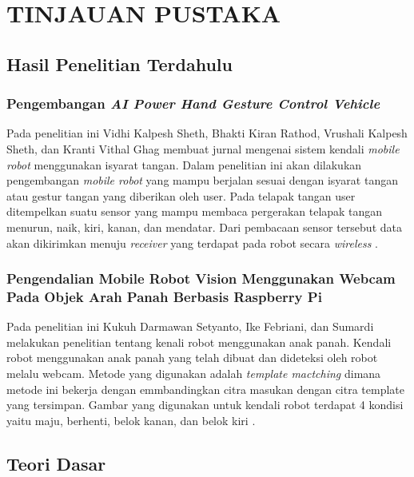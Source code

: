 \chapter{TINJAUAN PUSTAKA}

\section{Hasil Penelitian Terdahulu}
\subsection{Pengembangan \emph{AI Power Hand Gesture Control Vehicle}}
Pada penelitian ini Vidhi Kalpesh Sheth, Bhakti Kiran Rathod, Vrushali Kalpesh Sheth, dan Kranti Vithal Ghag membuat jurnal mengenai sistem kendali \textit{mobile robot} menggunakan isyarat tangan. Dalam penelitian ini akan dilakukan pengembangan \textit{mobile robot} yang mampu berjalan sesuai dengan isyarat tangan atau gestur tangan yang diberikan oleh user. Pada telapak tangan user ditempelkan suatu sensor yang mampu membaca pergerakan telapak tangan menurun, naik, kiri, kanan, dan mendatar. Dari pembacaan sensor tersebut data akan dikirimkan menuju \textit{receiver} yang terdapat pada robot secara \textit{wireless} \parencite{airobotvehicle}.

\subsection{Pengendalian Mobile Robot Vision Menggunakan Webcam Pada Objek Arah Panah Berbasis Raspberry Pi}
Pada penelitian ini Kukuh Darmawan Setyanto, Ike Febriani, dan Sumardi melakukan penelitian tentang kenali robot menggunakan anak panah. Kendali robot menggunakan anak panah yang telah dibuat dan dideteksi oleh robot melalu webcam. Metode yang digunakan adalah \emph{template mactching} dimana metode ini bekerja dengan emmbandingkan citra masukan dengan citra template yang tersimpan. Gambar yang digunakan untuk kendali robot terdapat 4 kondisi yaitu maju, berhenti, belok kanan, dan belok kiri \parencite{kukuh}. 


\section{Teori Dasar}

